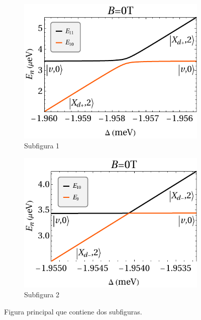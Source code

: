 \documentclass[main.tex]{subfiles}
\begin{document}
\begin{figure}[htbp]
	\centering
	\begin{subfigure}[b]{0.45\textwidth}
		\centering
		\includegraphics[width=\textwidth]{res/E11E10_B0}
		\caption{Subfigura 1}
		\label{fig:subfigura1}
	\end{subfigure}
	\hfill
	\begin{subfigure}[b]{0.45\textwidth}
		\centering
		\includegraphics[width=\textwidth]{res/E10E9_B0}
		\caption{Subfigura 2}
		\label{fig:subfigura2}
	\end{subfigure}
	\caption{Figura principal que contiene dos subfiguras.}
	\label{fig:figura_principal}
\end{figure}
\end{document}
